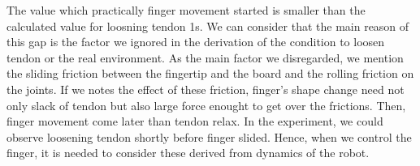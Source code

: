 \documentclass{llncs}
\begin{document}
The value which practically finger movement started is smaller than the calculated value for loosning tendon 1s.
We can consider that the main reason of this gap is the factor we ignored in the derivation of the condition to loosen tendon or the real environment.
As the main factor we disregarded, we mention the sliding friction between the fingertip and the board and the rolling friction on the joints.
If we notes the effect of these friction, 
finger's shape change need not only slack of tendon but also large force enought to get over the frictions.
Then, finger movement come later than tendon relax.
In the experiment, we could observe loosening tendon shortly before finger slided.
Hence, when we control the finger, it is needed to consider these derived from dynamics of the robot.
\end{document}
